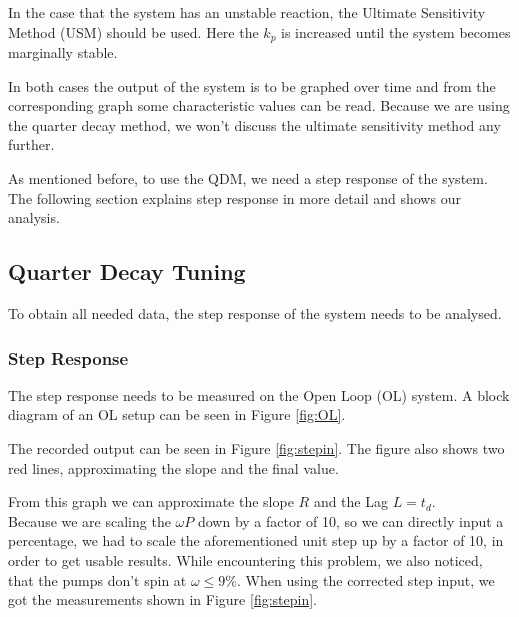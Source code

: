In the case that the system has an unstable reaction,
the Ultimate Sensitivity Method (USM) should be used.
Here the $k_p$ is increased until the system becomes marginally stable.
\cite{Franklin2014}

In both cases the output of the system is to be graphed over time
and from the corresponding graph some characteristic values can be read.
Because we are using the quarter decay method,
we won't discuss the ultimate sensitivity method any further.

As mentioned before,
to use the QDM, we need a step response of the system.
The following section explains step response in more detail and shows our analysis.

\subsection{Quarter Decay Tuning}\label{sub:quadec}
To obtain all needed data, the step response of the system
needs to be analysed.

\subsubsection{Step Response}
The step response needs to be measured on the Open Loop (OL) system.
A block diagram of an OL setup can be seen in Figure \ref{fig:OL}.


The recorded output can be seen in Figure \ref{fig:stepin}.
The figure also shows two red lines, approximating the slope and the final value.


From this graph we can approximate the slope $R$ and the Lag $L=t_d$.\\
Because we are scaling the $\omega P$ down by a factor of 10, so we can directly input a percentage,
we had to scale the aforementioned unit step up by a factor of 10,
in order to get usable results.
While encountering this problem, we also noticed, that the pumps don't spin at $\omega \leq 9\%$.
When using the corrected step input, we got the measurements shown in Figure \ref{fig:stepin}.

